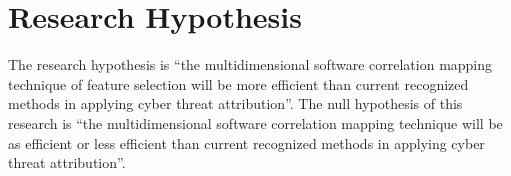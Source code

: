 \documentclass[12pt]{report}
\begin{document}

\section{Research Hypothesis} 
The research hypothesis is ``the multidimensional software correlation mapping technique of feature selection will be more efficient than current recognized methods in applying cyber threat attribution''. The null hypothesis of this research is ``the multidimensional software correlation mapping technique will be as efficient or less efficient than current recognized methods in applying cyber threat attribution''.
\end{document}
